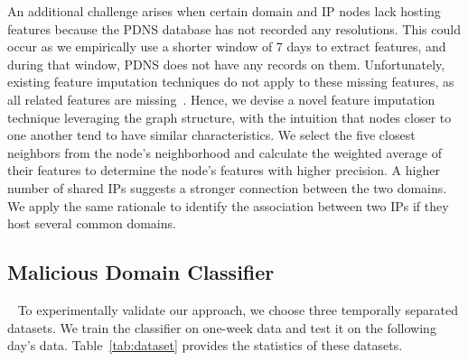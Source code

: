 An additional challenge arises when certain domain and IP nodes lack hosting features because the PDNS database has not recorded any resolutions. This could occur as we empirically use a shorter window of 7 days to extract features, and during that window, PDNS does not have any records on them. Unfortunately, existing feature imputation techniques do not apply to these missing features, as all related features are missing~\cite{grape2020}. Hence, we devise a novel feature imputation technique leveraging the graph structure, with the intuition that nodes closer to one another tend to have similar characteristics. We select the five closest neighbors from the node's neighborhood and calculate the weighted average of their features to determine the node's features with higher precision. A higher number of shared IPs suggests a stronger connection between the two domains. We apply the same rationale to identify the association between two IPs if they host several common domains.



\subsection{Malicious Domain Classifier}~\label{subsec:modeltraining}
To experimentally validate our approach, we choose three temporally separated datasets. We train the classifier on one-week data and test it on the following day's data. Table~\ref{tab:dataset} provides the statistics of these datasets.

